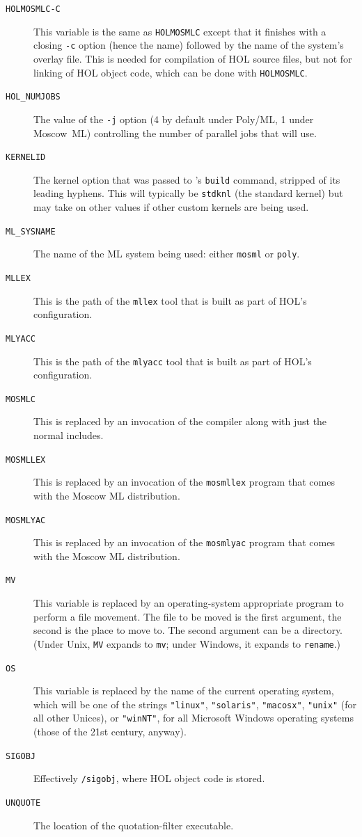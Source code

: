 \begin{description}
\item[\texttt{HOLMOSMLC-C}] This variable is the same as
  \texttt{HOLMOSMLC} except that it finishes with a closing
  \texttt{-c} option (hence the name) followed by the name of the
  system's overlay file.  This is needed for compilation of HOL source
  files, but not for linking of HOL object code, which can be done
  with \texttt{HOLMOSMLC}.
\item[\texttt{HOL\_NUMJOBS}] The value of the \texttt{-j} option (4 by default under Poly/ML, 1 under Moscow~ML) controlling the number of parallel jobs that \holmake{} will use.
\item[\texttt{KERNELID}]
  The kernel option that was passed to \HOL's \texttt{build} command, stripped of its leading hyphens.
  This will typically be \texttt{stdknl} (the standard kernel) but may take on other values if other custom kernels are being used.
\item[\texttt{ML\_SYSNAME}] The name of the ML system being used:
  either \texttt{mosml} or \texttt{poly}.
\item[\texttt{MLLEX}] This is the path of the \texttt{mllex} tool that
  is built as part of HOL's configuration.
\item[\texttt{MLYACC}] This is the path of the \texttt{mlyacc} tool that
  is built as part of HOL's configuration.
\item[\texttt{MOSMLC}] This is replaced by an invocation of the
  compiler along with just the normal includes.
\item[\texttt{MOSMLLEX}] This is replaced by an invocation of the
  \texttt{mosmllex} program that comes with the Moscow ML
  distribution.
\item[\texttt{MOSMLYAC}] This is replaced by an invocation of the
  \texttt{mosmlyac} program that comes with the Moscow ML
  distribution.
\item[\texttt{MV}] This variable is replaced by an operating-system
  appropriate program to perform a file movement.  The file to be
  moved is the first argument, the second is the place to move to.
  The second argument can be a directory.  (Under Unix, \texttt{MV}
  expands to \texttt{mv}; under Windows, it expands to \texttt{rename}.)
\item[\texttt{OS}] This variable is replaced by the name of the
  current operating system, which will be one of the strings
  \texttt{"linux"}, \texttt{"solaris"}, \texttt{"macosx"},
  \texttt{"unix"} (for all other Unices), or \texttt{"winNT"}, for all
  Microsoft Windows operating systems (those of the 21st century,
  anyway).
\item[\texttt{SIGOBJ}] Effectively \texttt{/sigobj},
  where HOL object code is stored.
  \item[\texttt{UNQUOTE}] The location of the quotation-filter executable.
\end{description}
